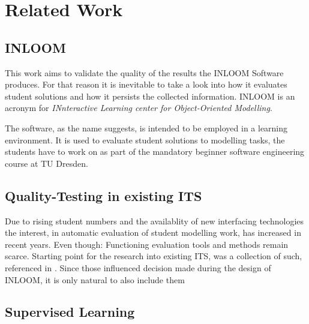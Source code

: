 \chapter{Related Work}
\label{ch:related_work}

\section[INLOOM]{INLOOM}
This work aims to validate the quality of the results the INLOOM Software \cite{1}
produces. For that reason it is inevitable to take a look into how it evaluates
student solutions and how it persists the collected information. INLOOM is an
acronym for \textit{INnteractive Learning center for Object-Oriented Modelling}. 

The software, as the name suggests, is intended to be employed in a learning environment.
It is used to evaluate student solutions to modelling tasks, the students have to work 
on as part of the mandatory beginner software engineering course at TU Dresden.

\section[Quality-Testing in existing ITS]{Quality-Testing in existing ITS}
Due to rising student numbers and the availablity of new interfacing technologies the
interest, in automatic evaluation of student modelling work, has increased in recent 
years. Even though: Functioning evaluation tools and methods remain scarce. 
Starting point for the research into existing ITS, was a collection of such, referenced
in \cite{1}. Since those influenced decision made during the design of INLOOM, it is
only natural to also include them 


\section[Supervised Learning]{Supervised Learning}